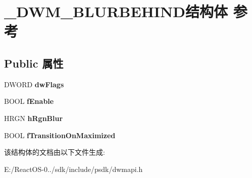 \hypertarget{struct___d_w_m___b_l_u_r_b_e_h_i_n_d}{}\section{\+\_\+\+D\+W\+M\+\_\+\+B\+L\+U\+R\+B\+E\+H\+I\+N\+D结构体 参考}
\label{struct___d_w_m___b_l_u_r_b_e_h_i_n_d}
\subsection*{Public 属性}
\begin{DoxyCompactItemize}
\item 
\mbox{\label{struct___d_w_m___b_l_u_r_b_e_h_i_n_d_a18828cba24e4f65d4e3cf3dbef3e9e86}} 
D\+W\+O\+RD {\bfseries dw\+Flags}
\item 
\mbox{\label{struct___d_w_m___b_l_u_r_b_e_h_i_n_d_a7cdf1fc2241b3a3ed78bb91441a9a794}} 
B\+O\+OL {\bfseries f\+Enable}
\item 
\mbox{\label{struct___d_w_m___b_l_u_r_b_e_h_i_n_d_a7e436d389aaac158df7f28749a4666e6}} 
H\+R\+GN {\bfseries h\+Rgn\+Blur}
\item 
\mbox{\label{struct___d_w_m___b_l_u_r_b_e_h_i_n_d_a6d8e7336e33feca6bf4f25c9b01cdd49}} 
B\+O\+OL {\bfseries f\+Transition\+On\+Maximized}
\end{DoxyCompactItemize}


该结构体的文档由以下文件生成\+:\begin{DoxyCompactItemize}
\item 
E\+:/\+React\+O\+S-\/0../sdk/include/psdk/dwmapi.\+h\end{DoxyCompactItemize}
